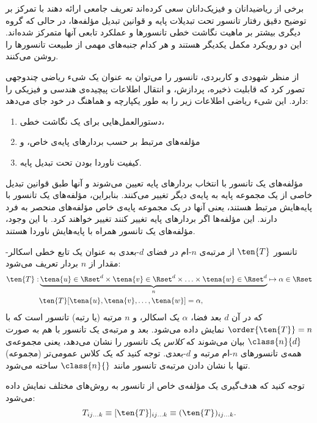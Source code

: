 برخی از ریاضیدانان و فیزیک‌دانان سعی کرده‌اند تعریف جامعی ارائه دهند با تمرکز بر توضیح دقیق رفتار تانسور تحت تبدیلات پایه و قوانین تبدیل مؤلفه‌ها، در حالی که گروه دیگری بیشتر بر ماهیت نگاشت خطی تانسورها و عملکرد تابعی آنها متمرکز شده‌اند. این دو رویکرد مکمل یکدیگر هستند و هر کدام جنبه‌های مهمی از طبیعت تانسورها را روشن می‌کنند.

از منظر شهودی و کاربردی، تانسور را می‌توان به عنوان یک شیء ریاضی چندوجهی تصور کرد که قابلیت ذخیره، پردازش، و انتقال اطلاعات پیچیده‌ی هندسی و فیزیکی را دارد. این شیء ریاضی اطلاعات زیر را به طور یکپارچه و هماهنگ در خود جای می‌دهد:

\begin{enumerate}
    \item دستورالعمل‌هایی برای یک نگاشت خطی،
    \item مؤلفه‌های مرتبط بر حسب بردارهای پایه‌ی خاص، و
    \item کیفیت ناوردا بودن تحت تبدیل پایه.
\end{enumerate}

مؤلفه‌های یک تانسور با انتخاب بردارهای پایه تعیین می‌شوند و آنها طبق قوانین تبدیل خاصی از یک مجموعه پایه به پایه‌ی دیگر تغییر می‌کنند. بنابراین، مؤلفه‌های یک تانسور با پایه‌هایش مرتبط هستند، یعنی آنها در یک مجموعه پایه‌ی خاص مؤلفه‌های منحصر به فرد دارند. این مؤلفه‌ها اگر بردارهای پایه تغییر کنند تغییر خواهند کرد. با این وجود، مؤلفه‌های یک تانسور همراه با پایه‌هایش ناوردا هستند.

\begin{definition}[تانسور]\label{def:tensors}
    تانسور $\ten{T}$ از مرتبه‌ی $n$-ام در فضای $d$-بعدی به عنوان یک تابع خطی اسکالر-مقدار از $n$ بردار تعریف می‌شود:
    \begin{equation}
        \begin{aligned}
            \ten{T}: & \underbrace{\tena{u}\in\Rset^d\times\tena{v}\in\Rset^d\times\ldots  \times\tena{w}\in\Rset^d}_n   \mapsto \alpha\in\Rset \\
                     & \ten{T}[\tena{u},\tena{v},\ldots,\tena{w}]=\alpha,
        \end{aligned}
    \end{equation}
    که در آن $d$ بعد فضا، $\alpha$ یک اسکالر، و $n$ مرتبه (یا رتبه) تانسور است که با $\order{\ten{T}}=n$ نمایش داده می‌شود. بعد و مرتبه‌ی یک تانسور با هم به صورت $\class{n}{d}$ بیان می‌شوند که \textit{کلاس} یک تانسور را نشان می‌دهد، یعنی مجموعه‌ی همه‌ی تانسورهای $n$-ام مرتبه و $d$-بعدی. توجه کنید که یک کلاس عمومی‌تر (مجموعه) تنها با نشان دادن مرتبه‌ی تانسور مانند $\class{n}{}$ ساخته می‌شود.

    توجه کنید که هدف‌گیری یک مؤلفه‌ی خاص از تانسور به روش‌های مختلف نمایش داده می‌شود:
    \begin{equation}
        T_{ij\ldots k}\equiv[\ten{T}]_{ij\ldots k}\equiv (\ten{T})_{ij\ldots k}.
    \end{equation}
\end{definition}

